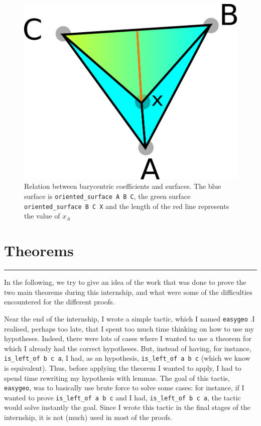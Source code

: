 \documentclass[a4paper,10pt]{article}
\begin{document}
\begin{figure}
  \centering
  \includegraphics[scale=2]{cara.png}

  \caption{\label{cara} Relation between barycentric coefficients and surfaces.
    The blue surface is {\tt oriented\_surface A B C}, the green surface {\tt oriented\_surface B C X} and the length of the red line represents the value of $x_A$}
\end{figure}


\section{Theorems}
\rule{\linewidth}{0.5pt}
In the following, we try to give an idea of the work that was done to prove the two main theorems during this internship, and what were some of the difficulties encountered for the different proofs.

Near the end of the internship, I wrote a simple tactic, which I named {\tt easygeo} \label{easygeo}.I realised, perhaps too late, that I spent too much time thinking on how to use my hypotheses. Indeed, there were lots of cases where I wanted to use a theorem for which I already had the correct hypotheses. But, instead of having, for instance, {\tt is\_left\_of b c a}, I had, as an hypothesis, {\tt is\_left\_of a b c} (which we know is equivalent). Thus, before applying the theorem I wanted to apply, I had to spend time rewriting my hypothesis with lemmas. The goal of this tactis, {\tt easygeo}, was to basically use brute force to solve some cases: for instance, if I wanted to prove {\tt is\_left\_of a b c} and I had, {\tt is\_left\_of b c a}, the tactic would solve instantly the goal. Since I wrote this tactic in the final stages of the internship, it is not (much) used in most of the proofs.
\end{document}
